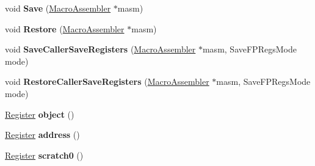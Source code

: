 \begin{DoxyCompactItemize}
\item 
void {\bfseries Save} (\hyperlink{classv8_1_1internal_1_1_macro_assembler}{Macro\+Assembler} $\ast$masm)\hypertarget{classv8_1_1internal_1_1_record_write_stub_1_1_register_allocation_a76f90ec53d09edfeb4a3de14141c921d}{}\label{classv8_1_1internal_1_1_record_write_stub_1_1_register_allocation_a76f90ec53d09edfeb4a3de14141c921d}

\item 
void {\bfseries Restore} (\hyperlink{classv8_1_1internal_1_1_macro_assembler}{Macro\+Assembler} $\ast$masm)\hypertarget{classv8_1_1internal_1_1_record_write_stub_1_1_register_allocation_a391db63ae1afc97c528cf3b5e92b9c2a}{}\label{classv8_1_1internal_1_1_record_write_stub_1_1_register_allocation_a391db63ae1afc97c528cf3b5e92b9c2a}

\item 
void {\bfseries Save\+Caller\+Save\+Registers} (\hyperlink{classv8_1_1internal_1_1_macro_assembler}{Macro\+Assembler} $\ast$masm, Save\+F\+P\+Regs\+Mode mode)\hypertarget{classv8_1_1internal_1_1_record_write_stub_1_1_register_allocation_a676d8a1bb19a5746cfc613e7374253e0}{}\label{classv8_1_1internal_1_1_record_write_stub_1_1_register_allocation_a676d8a1bb19a5746cfc613e7374253e0}

\item 
void {\bfseries Restore\+Caller\+Save\+Registers} (\hyperlink{classv8_1_1internal_1_1_macro_assembler}{Macro\+Assembler} $\ast$masm, Save\+F\+P\+Regs\+Mode mode)\hypertarget{classv8_1_1internal_1_1_record_write_stub_1_1_register_allocation_ab0958eb63ba22b285852dcc0cc87c285}{}\label{classv8_1_1internal_1_1_record_write_stub_1_1_register_allocation_ab0958eb63ba22b285852dcc0cc87c285}

\item 
\hyperlink{structv8_1_1internal_1_1_register}{Register} {\bfseries object} ()\hypertarget{classv8_1_1internal_1_1_record_write_stub_1_1_register_allocation_ae02efad51bfcbf6207b6bd04c1331e06}{}\label{classv8_1_1internal_1_1_record_write_stub_1_1_register_allocation_ae02efad51bfcbf6207b6bd04c1331e06}

\item 
\hyperlink{structv8_1_1internal_1_1_register}{Register} {\bfseries address} ()\hypertarget{classv8_1_1internal_1_1_record_write_stub_1_1_register_allocation_a7b0d92fe5d7ba3d4339a055369bc1750}{}\label{classv8_1_1internal_1_1_record_write_stub_1_1_register_allocation_a7b0d92fe5d7ba3d4339a055369bc1750}

\item 
\hyperlink{structv8_1_1internal_1_1_register}{Register} {\bfseries scratch0} ()\hypertarget{classv8_1_1internal_1_1_record_write_stub_1_1_register_allocation_ae60e0fd70f8010f33818c9a5a30d0057}{}\label{classv8_1_1internal_1_1_record_write_stub_1_1_register_allocation_ae60e0fd70f8010f33818c9a5a30d0057}


\end{DoxyCompactItemize}
